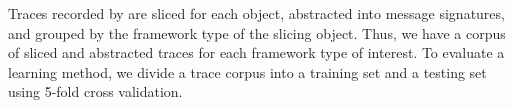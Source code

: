 \documentclass[10pt,reprint,nocopyrightspace,numbers]{sigplanconf}
\begin{document}
Traces recorded by \toolname{} are sliced for each object, abstracted into message signatures, and grouped by the framework type of the slicing object.
Thus, we have a corpus of sliced and abstracted traces for each framework type of interest.
To evaluate a learning method, we divide a trace corpus into a training set and a testing set using 5-fold cross validation.





\newcommand{\tblunitstyle}{\relsize{-1}}
\newcommand{\fmtbench}[1]{{\ttfamily\fontseries{l}\selectfont\fwktystyle\color{black}#1}}
\newcommand{\AsyncTaskBench}{\fmtbench{AsyncTask}}
\newcommand{\FragmentBench}{\fmtbench{Fragment}}
\newcommand{\FragmentFourBench}{\fmtbench{FragmentV4}}
\newcommand{\ButtonBench}{\fmtbench{Button}}
\newcommand{\fwktype}{f-type}
\end{document}
